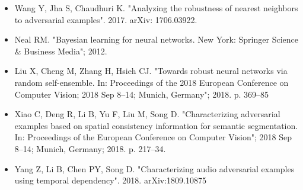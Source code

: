 \documentclass[ 12pt,a4paper,twocolumn,fleqn]{article}
\begin{document}
\begin{itemize}
    \item Wang Y, Jha S, Chaudhuri K. "Analyzing the robustness of nearest neighbors to adversarial examples". 2017. arXiv: 1706.03922.
    \item Neal RM. "Bayesian learning for neural networks. New York: Springer Science & Business Media"; 2012.
    \item Liu X, Cheng M, Zhang H, Hsieh CJ. "Towards robust neural networks via random self-ensemble. In: Proceedings of the 2018 European Conference on Computer Vision; 2018 Sep 8–14; Munich, Germany"; 2018. p. 369–85
    \item Xiao C, Deng R, Li B, Yu F, Liu M, Song D. "Characterizing adversarial examples based on spatial consistency information for semantic segmentation. In: Proceedings of the European Conference on Computer Vision"; 2018 Sep 8–14; Munich, Germany; 2018. p. 217–34.
    \item Yang Z, Li B, Chen PY, Song D. "Characterizing audio adversarial examples using temporal dependency". 2018. arXiv:1809.10875
\end{itemize}
\end{document}
